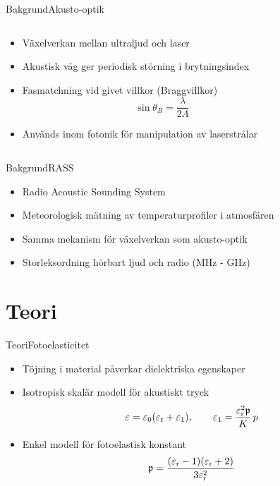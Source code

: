 \documentclass[11pt, final]{beamer}
\begin{document}
	\begin{frame}{Bakgrund}{Akusto-optik}
		\begin{columns}
			\begin{column}{0.6\textwidth}
				\begin{itemize}
					\item<1-> Växelverkan mellan ultraljud och laser
					\item<1-> Akustisk våg ger periodisk störning i brytningsindex
					\item<2-> Fasmatchning vid givet villkor (Braggvillkor)
					\begin{equation*}
						\sin{\theta_B} = \frac{\lambda}{2\Lambda}
					\end{equation*}
					\item<3-> Används inom fotonik för manipulation av laserstrålar
				\end{itemize}
			\end{column}
			\begin{column}{0.4\textwidth}
				\uncover<2->{
					\resizebox{\textwidth}{!}{
						
					}
				}
			\end{column}
		\end{columns}
	\end{frame}
	
	\begin{frame}{Bakgrund}{RASS}
		\begin{itemize}
			\item Radio Acoustic Sounding System
			\item Meteorologisk mätning av temperaturprofiler i atmosfären
			\pause
			\item Samma mekanism för växelverkan som akusto-optik
			\item Storleksordning hörbart ljud och radio (MHz - GHz)
		\end{itemize}
	\end{frame}
	
	\section{Teori}
	
	\begin{frame}{Teori}{Fotoelasticitet}
		\begin{itemize}
			\item Töjning i material påverkar dielektriska egenskaper
			\pause
			\item Isotropisk skalär modell för akustiskt tryck
			\begin{equation*}
				\varepsilon = \varepsilon_0 (\varepsilon_{\mathrm{r}} + \varepsilon_1), \qquad \varepsilon_1 = \frac{\varepsilon_{\mathrm{r}}^2 \mathfrak{p}}{K} \,p
			\end{equation*}
			\item Enkel modell för fotoelastisk konstant
			\begin{equation*}
				\mathfrak{p} = \frac{(\varepsilon_{\mathrm{r}} - 1)(\varepsilon_{\mathrm{r}} + 2)}{3\varepsilon_{\mathrm{r}}^2}
			\end{equation*}
		\end{itemize}
	\end{frame}
	
\end{document}
